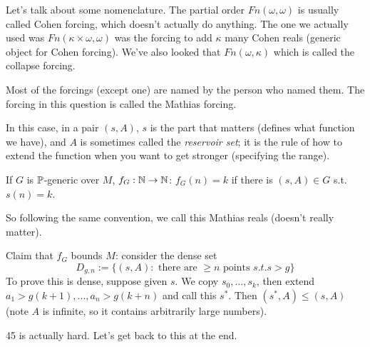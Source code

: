 \documentclass[a4paper]{article}
\begin{document}
Let's talk about some nomenclature. The partial order $Fn(\omega,\omega)$ is usually called Cohen forcing, which doesn't actually do anything. The one we actually used was $Fn(\kappa \times \omega,\omega)$ was the forcing to add $\kappa$ many Cohen reals (generic object for Cohen forcing). We've also looked that $Fn(\omega,\kappa)$ which is called the collapse forcing.

Most of the forcings (except one) are named by the person who named them. The forcing in this question is called the Mathias forcing.

In this case, in a pair $(s,A)$, $s$ is the part that matters (defines what function we have), and $A$ is sometimes called the \emph{reservoir set}; it is the rule of how to extend the function when you want to get stronger (specifying the range).

If $G$ is $\P$-generic over $M$, $f_G:\N \to \N$: $f_G(n) = k$ if there is $(s,A) \in G$ s.t. $s(n) = k$.

So following the same convention, we call this Mathias reals (doesn't really matter).

Claim that $f_G$ bounds $M$: consider the dense set
\[
D_{g,n}:=\{(s,A) : \text{ there are } \geq n \text{ points } s.t. s > g\}
\]
To prove this is dense, suppose given $s$. We copy $s_0,...,s_k$, then extend $a_1>g(k+1),...,a_n>g(k+n)$ and call this $s^*$. Then $(s^*,A) \leq (s,A)$ (note $A$ is infinite, so it contains arbitrarily large numbers).

45 is actually hard. Let's get back to this at the end.
\end{document}
